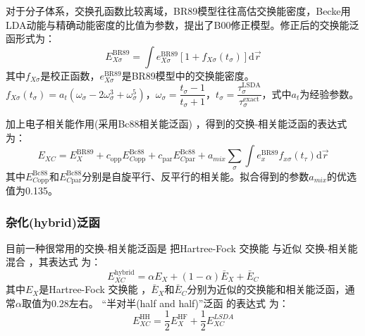 对于分子体系，交换孔函数比较离域，BR89模型往往高估交换能密度，Becke用LDA动能与精确动能密度的比值为参数，提出了B00修正模型。修正后的交换能泛函形式为：
\begin{equation}
	E_{X\sigma}^{\mathrm{BR89}}=\int e_{X\sigma}^{\mathrm{BR89}}[1+f_{X\sigma}(t_{\sigma})
  ]\textrm{d}\vec r
  \label{eq:dft-24}
\end{equation}
其中$f_{X\sigma}$是校正函数，$e_{X\sigma}^{\mathrm{BR89}}$是BR89模型中的交换能密度。$f_{X\sigma}(t_{\sigma})=a_t(\omega_{\sigma}-2\omega_{\sigma}^3+\omega_{\sigma}^5)$，$\omega_{\sigma}=\dfrac{t_{\sigma}-1}{t_{\sigma}+1}$，$t_{\sigma}=\dfrac{\tau_{\sigma}^{\mathrm{LSDA}}}{\tau_{\sigma}^{\mathrm{exact}}}$，式中$a_t$为经验参数。

加上{电子}相关{能}作用(采用Bc88相关能泛函)
，得到的交换-相关能{泛函的}表达式为：
\begin{equation}
	E_{XC}=E_X^{\mathrm{BR89}}+c_{\mathrm{opp}}E_{C\mathrm{opp}}^{\mathrm{Bc88}}+c_{\mathrm{par}}E_{C\mathrm{par}}^{\mathrm{Bc88}}+a_{mix}\sum_{\sigma}\int e_x^{\mathrm{BR89}}f_{x\sigma}(t_{\tau})\textrm{d}\vec r
  \label{eq:dft-25}
\end{equation}
其中$E_{C\mathrm{opp}}^{\mathrm{Bc88}}$和$E_{C\mathrm{par}}^{\mathrm{Bc88}}$分别是自旋平行、反平行的相关能。拟合得到的参数$a_{mix}$的优选值为0.135。

\subsubsection{{杂化(hybrid)}泛函}
{目前}一种很常用的交换-相关能{泛函}是%
把Hartree-Fock%
{交换}能%
与近似%
交换-相关能%
混合%
，其表达式%
为：
\begin{equation}
	E_{XC}^{\mathrm{hybrid}}=\alpha E_X+(1-\alpha)\bar{E}_X+\bar{E}_C
 \label{eq:dft-11}
\end{equation}
其中$E_X$是Hartree-Fock%
{交换}能%
，$\bar{E}_X$和$\bar{E}_C$分别为近似的交换能和相关能泛函，通常$\alpha$取值为0.28左右。%
“半对半(half and half)”泛函%
{的}表达式%
{为}：
\begin{equation}
	E_{XC}^{\mathrm{HH}}=\dfrac12E_{X}^{\mathrm{HF}}+\dfrac12E_{XC}^{LSDA}
  \label{eq:dft-26}
\end{equation}

